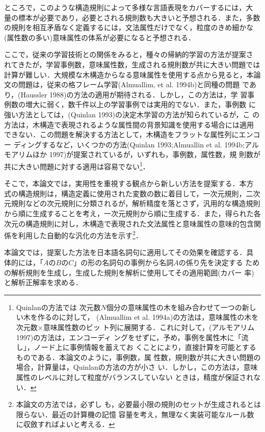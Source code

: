 ところで，このような構造規則によって多様な言語表現をカバーするには，大
量の標本が必要であり，必要とされる規則数も大きいと予想される．また，多数
の規則を相互矛盾なく定義するには，文法属性だけでなく，粒度のきめ細かな
(属性数の多い)意味属性の体系が必要になると予想される．

ここで，従来の学習技術との関係をみると，種々の帰納的学習の方法が提案さ
れてきたが，学習事例数，意味属性数，生成される規則数が共に大きい問題では
計算が難しい．大規模な木構造からなる意味属性を使用する点から見ると，本論
文の問題は，従来の格フレーム学習(Almuallim, et al. 1994b)と同種の問題
であり，(Haussler 1988)の方法の適用が期待される．しかし，この方法は，学
習事例数の増大に弱く，数千件以上の学習事例では実用的でない．また，事例数
に強い方法としては，(Quinlan 1993)の決定木学習の方法が知られているが，こ
の方法は，木構造で表現されるような属性間の背景知識を使用する場合には適用
できない．この問題を解決する方法として，木構造をフラットな属性列にエンコー
ディングするなど，いくつかの方法(Quinlan 1993;Almuallin et al. 1994b;アルモアリムほか 1997)が提案されているが，いずれも，事例数，属性数，規
則数が共に大きい問題に対する適用は容易でない\footnote{Quinlanの方法では
次元数$N$個分の意味属性の木を組み合わせて一つの新しい木を作るのに対して，
(Almuallim et al. 1994a)の方法は，意味属性の木を次元数×意味属性数のビッ
ト列に展開する．これに対して，(アルモアリム 1997)の方法は，エンコーディ
ングをせずに，予め，事例を属性木に「流し」，ノード上に事例情報を蓄えてお
くことにより，直接計算を可能とするものである．本論文のように，事例数，属
性数，規則数が共に大きい問題の場合，計算量は，Quinlanの方法の方が小さ
い．しかし，この方法は，意味属性のレベルに対して粒度がバランスしていない
ときは，精度が保証されない．}．

そこで，本論文では，実用性を重視する観点から新しい方法を提案する．本方
式の構造規則は，構造定義に使用された変数の数に着目して，一次元規則，二次
元規則などの次元規則に分類されるが，解析精度を落とさず，汎用的な構造規則
から順に生成することを考え，一次元規則から順に生成する．また，得られた各
次元の構造規則に対し，木構造で表現された文法属性と意味属性の意味的包含関
係を利用した自動的な汎化の方法を示す\footnote{本論文の方法では，必ずし
も，必要最小限の規則のセットが生成されるとは限らない．最近の計算機の記憶
容量を考え，無理なく実装可能なルール数に収斂すればよいと考える．}．

本論文では，提案した方法を日本語名詞句に適用してその効果を確認する．具
体的には，「$AのBのC$」の形の名詞句の事例から名詞$A$の係り先を決定する
ための解析規則を生成し，生成した規則を解析に使用してその適用範囲(カバー
率)と解析正解率を求める．

